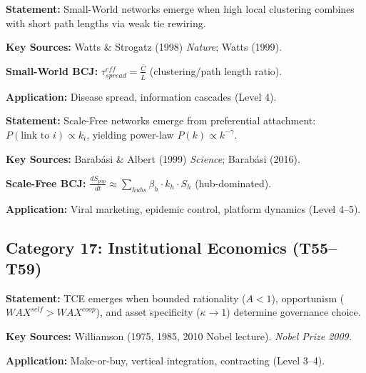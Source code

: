 \begin{tcolorbox}[colback=violet!5!white, colframe=violet!75!black,
    title=Theorem BCJ-T53: Watts-Strogatz Small World as Special Case]
\textbf{Statement:} Small-World networks emerge when high local clustering combines with short path lengths via weak tie rewiring.

\textbf{Key Sources:} Watts \& Strogatz (1998) \textit{Nature}; Watts (1999).

\textbf{Small-World BCJ:} $\tau^{eff}_{spread} = \frac{\bar{C}}{\bar{L}}$ (clustering/path length ratio).

\textbf{Application:} Disease spread, information cascades (Level 4).
\end{tcolorbox}

\begin{tcolorbox}[colback=violet!5!white, colframe=violet!75!black,
    title=Theorem BCJ-T54: Barabási-Albert Scale-Free Networks as Special Case]
\textbf{Statement:} Scale-Free networks emerge from preferential attachment: $P(\text{link to } i) \propto k_i$, yielding power-law $P(k) \propto k^{-\gamma}$.

\textbf{Key Sources:} Barabási \& Albert (1999) \textit{Science}; Barabási (2016).

\textbf{Scale-Free BCJ:} $\frac{dS_{pop}}{dt} \approx \sum_{hubs} \beta_h \cdot k_h \cdot S_h$ (hub-dominated).

\textbf{Application:} Viral marketing, epidemic control, platform dynamics (Level 4--5).
\end{tcolorbox}

\subsection{Category 17: Institutional Economics (T55--T59)}

\begin{tcolorbox}[colback=gray!5!white, colframe=gray!75!black,
    title=Theorem BCJ-T55: Williamson Transaction Cost Economics as Special Case]
\textbf{Statement:} TCE emerges when bounded rationality ($A < 1$), opportunism ($WAX^{self} > WAX^{coop}$), and asset specificity ($\kappa \to 1$) determine governance choice.

\textbf{Key Sources:} Williamson (1975, 1985, 2010 Nobel lecture). \textit{Nobel Prize 2009.}

\textbf{Application:} Make-or-buy, vertical integration, contracting (Level 3--4).
\end{tcolorbox}

